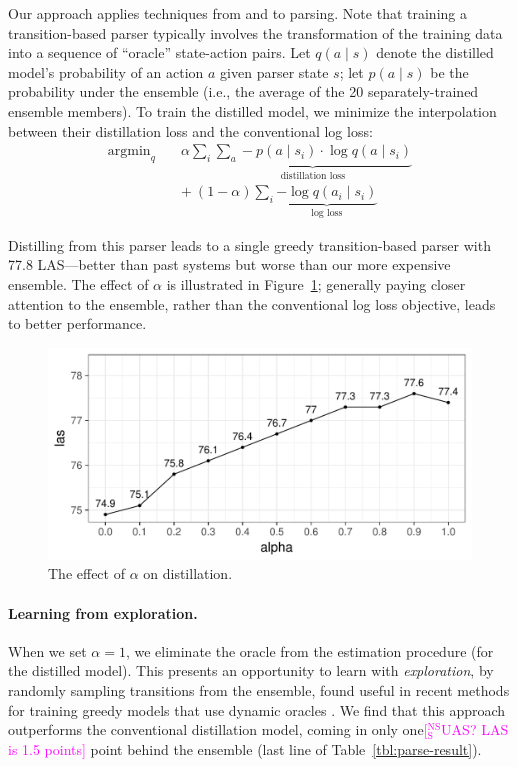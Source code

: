\documentclass[11pt,a4paper]{article}
\DeclareMathOperator*{\argmin}{argmin}
\newcommand{\nss}[1]{\textcolor{magenta}{[$_\mathrm{S}^\mathrm{NS}$#1]}}
\begin{document}
Our approach applies techniques from 
and  to parsing.
Note that training a transition-based parser typically involves the
transformation of the training data into a sequence of ``oracle'' state-action
pairs.
Let $q(a \mid s)$ denote the distilled model's
probability of an action $a$ given parser state $s$; let $p(a\mid s)$ be the probability under the
ensemble (i.e., the average of the 20 separately-trained ensemble
members).
To train the distilled model, we minimize the interpolation between
their distillation loss and the conventional log loss:
\begin{align}
{\argmin}_q \quad  & \alpha \sum_i \underbrace{\sum_{a} -p(a
	\mid s_i) \cdot \log q(a \mid s_i)}_{\text{distillation loss}} \\
& +\ (1 - \alpha) \sum_i \underbrace{- \log q(a_i \mid
  s_i)}_{\text{log loss}} \nonumber
\end{align}

Distilling from this 
parser leads to a single greedy transition-based parser with 77.8
LAS---better than past systems but worse than our more expensive ensemble.
The effect of $\alpha$ is illustrated in
Figure~\ref{fig:effect-alpha}; generally paying closer attention to
the ensemble, rather than the conventional log loss objective, leads
to better performance.

\begin{figure}[t]
	\centering
	\includegraphics[width=\columnwidth,trim={0.3cm 0 0 0},clip]{graphics/alpha}
	\caption{The effect of $\alpha$ on distillation.\label{fig:effect-alpha}}
\end{figure}

\paragraph{Learning from exploration.} When we set $\alpha =1$, we
eliminate the oracle from the estimation procedure (for the distilled
model).  This presents an opportunity to learn with \emph{exploration}, by
randomly sampling transitions from the ensemble, found useful
in recent methods for training greedy models that use dynamic oracles
\citep{goldberg-nivre:2012:PAPERS,TACL145,TACL885,ballesteros-EtAl:2016:EMNLP2016}.  
We find that this
approach outperforms the  conventional distillation model, coming in
only one\nss{UAS? LAS is 1.5 points} point behind the ensemble (last line of Table~\ref{tbl:parse-result}).
\end{document}
